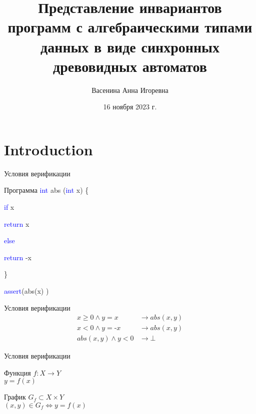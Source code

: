 \documentclass{beamer}
\title[]{Представление инвариантов программ с алгебраическими типами данных в виде синхронных древовидных автоматов}
\author[Васенина А.~И.]{Васенина Анна Игоревна}
\institute[СПбГУ]{Санкт-Петербургский государственный университет \\ Кафедра системного программирования}
\date[16 ноября 2023 г.]{16 ноября 2023 г.}
\begin{document}
\begin{frame}
  \titlepage
\end{frame}


\section{Introduction}

\begin{frame}{Условия верификации}
\begin{block}{Программа}
\textcolor{blue}{int} abs (\textcolor{blue}{int} x) \{

\quad \textcolor{blue}{if} x 

\quad \quad \textcolor{blue}{return} x 

\quad \textcolor{blue}{else}

\quad\quad \textcolor{blue}{return} -x

\}

\textcolor{blue}{assert}(abs(x) ) 
\end{block}
\pause
\begin{block}{Условия верификации}
\vspace{-1em}
\begin{align*}
    x  \geqslant 0 \wedge y = x &\to abs(x, y)\\
    x < 0 \wedge y = \text{-}x &\to abs(x, y)\\
    abs(x,y) \wedge y < 0 &\to \bot
\end{align*}
\end{block}

\end{frame}

\begin{frame}{Условия верификации}
\begin{exampleblock}{Функция}
$f: X \to Y$\\
$y = f(x)$
\end{exampleblock}
\begin{exampleblock}{График}
$G_f \subset X \times Y$ \\
$(x, y) \in G_f \iff y = f(x)$
\end{exampleblock}
\end{frame}
\end{document}
